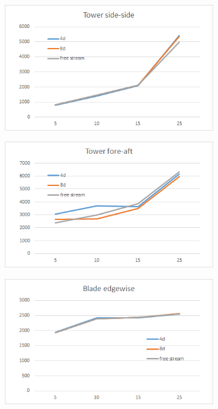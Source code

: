 \documentclass[10pt]{article}
\begin{document}
\begin{figure}[H]
  \centering
\begin{subfigure}{0.40\textwidth}
  \includegraphics[width=1\linewidth]{figures/delsTwrSide.png}
\end{subfigure}
\begin{subfigure}{0.40\textwidth}
  \includegraphics[width=1\linewidth]{figures/delsTwrFore.png}
\end{subfigure}
\begin{subfigure}{0.40\textwidth}
  \includegraphics[width=1\linewidth]{figures/delsBldEdge.png}

\end{subfigure}
\end{figure}
\end{document}
